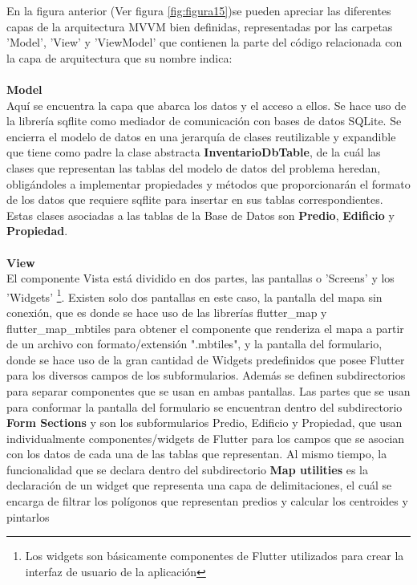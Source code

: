 En la figura anterior (Ver figura \ref{fig:figura15})se pueden apreciar las diferentes capas de la arquitectura MVVM bien definidas,
representadas por las carpetas 'Model', 'View' y 'ViewModel' que contienen la parte del código relacionada con la capa de arquitectura
que su nombre indica:\\\\
\textbf{Model}\label{item:Model}\\
Aquí se encuentra la capa que abarca los datos y el acceso a ellos. Se hace uso de la librería sqflite \cite{sqflite} como mediador de comunicación
con bases de datos SQLite. Se encierra el modelo de datos en una jerarquía de clases reutilizable y expandible que tiene como padre la clase abstracta \textbf{InventarioDbTable},
de la cuál las clases que representan las tablas del modelo de datos del problema heredan, obligándoles a implementar propiedades y métodos que proporcionarán
el formato de los datos que requiere sqflite para insertar en sus tablas correspondientes. Estas clases asociadas a las tablas de la Base de Datos
son \textbf{Predio}, \textbf{Edificio} y \textbf{Propiedad}.
\\\\
\textbf{View}\\
El componente Vista está dividido en dos partes, las pantallas o 'Screens' y los 'Widgets'
\footnote{Los widgets son básicamente componentes de Flutter utilizados para crear la interfaz de usuario de
    la aplicación}.
Existen solo dos pantallas en este caso, la pantalla del mapa sin conexión, que es donde se hace uso de las librerías flutter\_map y flutter\_map\_mbtiles para
obtener el componente que renderiza el mapa a partir de un archivo con formato/extensión ".mbtiles", y la pantalla del formulario, donde se hace uso de la gran
cantidad de Widgets predefinidos que posee Flutter para los diversos campos de los subformularios. Además se definen subdirectorios para separar componentes que se
usan en ambas pantallas. Las partes que se usan para conformar la pantalla del formulario se encuentran dentro del subdirectorio \textbf{Form Sections} y son los
subformularios Predio, Edificio y Propiedad, que usan individualmente componentes/widgets de Flutter para los campos que se asocian con los datos de cada una de
las tablas que representan. Al mismo tiempo, la funcionalidad que se declara dentro del subdirectorio \textbf{Map utilities} es la declaración de un widget
que representa una capa de delimitaciones, el cuál se encarga de filtrar los polígonos que representan predios y calcular los centroides y pintarlos\\
